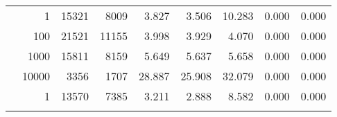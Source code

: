 \begin{table}
\begin{tabular}{rrrrrrrrr}
	            
	        
				\noalign{\smallskip}\hline
				\multirow{ 4 }{*}{ 80000 } &
				
					
					 
					\multirow{ 1 }{*}{ 1 } &
					
						
							    
							     15321  & 8009  
	                           & 3.827 & 3.506 & 10.283
	                           & 0.000 & 0.000  \\
	                
	            
					 &  
					 
					\multirow{ 1 }{*}{ 100 } &
					
						
							    
							     21521  & 11155  
	                           & 3.998 & 3.929 & 4.070
	                           & 0.000 & 0.000  \\
	                
	            
					 &  
					 
					\multirow{ 1 }{*}{ 1000 } &
					
						
							    
							     15811  & 8159  
	                           & 5.649 & 5.637 & 5.658
	                           & 0.000 & 0.000  \\
	                
	            
					 &  
					 
					\multirow{ 1 }{*}{ 10000 } &
					
						
							    
							     3356  & 1707  
	                           & 28.887 & 25.908 & 32.079
	                           & 0.000 & 0.000  \\
	                
	            
	        
				\noalign{\smallskip}\hline
				\multirow{ 4 }{*}{ 160000 } &
				
					
					 
					\multirow{ 1 }{*}{ 1 } &
					
						
							    
							     13570  & 7385  
	                           & 3.211 & 2.888 & 8.582
	                           & 0.000 & 0.000  \\
	                
	            
					 &  
					 

\end{tabular}
\end{table}
